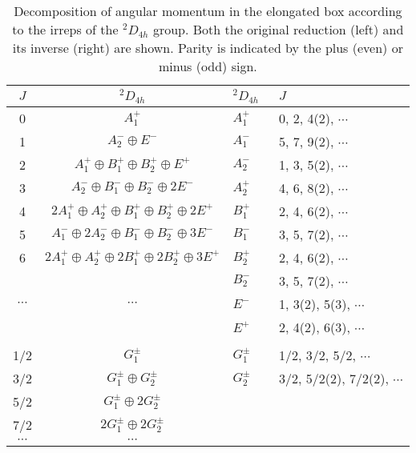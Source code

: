 \documentclass[aps,prd,reprint,showpacs,floatfix,longbibliography,,superscriptaddress]{revtex4-1}
\begin{document}
\begin{widetext}
%
\begin{table}
\begin{tabular}{c c | l l }\toprule
$J$ & $^2D_{4h}$  &  $^2D_{4h}\;\;$ &  $J$\\
\hline
0 & $A^+_1$                                                                                           & $A^+_1\;\;$  & 0,  2, 4(2),    $\cdots$   \\
1 & $A^-_2 \oplus E^-$                                                                           &  $A^-_1\;\;$  &  5,  7,  9(2), $\cdots$ \\
2 & $A^+_1 \oplus B^+_1\oplus B^+_2 \oplus E^+$                               & $A^-_2\;\;$  & 1,  3, 5(2),  $\cdots$   \\
3 & $A^-_2 \oplus B^-_1\oplus B^-_2 \oplus 2E^-$                                 & $A^+_2\;\;$  &  4, 6, 8(2),  $\cdots$   \\
4 & $2A^+_1 \oplus A^+_2\oplus B^+_1 \oplus B^+_2 \oplus 2E^+$      &   $B^+_1\;\;$  & 2,  4, 6(2), $\cdots$     \\
5 & $ A^-_1 \oplus 2A^-_2\oplus B^-_1 \oplus B^-_2 \oplus 3E^-$         &   $B^-_1\;\;$  & 3,  5, 7(2), $\cdots$  \\
6 & $2A^+_1 \oplus  A^+_2 \oplus 2B^+_1\oplus 2B^+_2 \oplus 3E^+$ &   $B^+_2\;\;$  & 2, 4, 6(2), $\cdots$ \\
   &                                                                                                            & $B^-_2\;\;$  & 3, 5, 7(2), $\cdots$  \\
$\cdots$ & $\cdots$                                                                                 & $E^-\;\;$   & 1,  3(2), 5(3), $\cdots$   \\
   &                                                                                                           &  $E^+\;\;$    &  2,  4(2), 6(3), $\cdots$ \\
   &                                                                                                            &   & \\
1/2 & $G^\pm_1$                                                                                      & $G^\pm_1\;\;$  & 1/2,  3/2, 5/2,  $\cdots$   \\
3/2 & $G^\pm_1\oplus G^\pm_2 $                                                            & $G^\pm_2\;\;$  & 3/2, 5/2(2), 7/2(2),  $\cdots$  \\
5/2 & $ G^\pm_1\oplus 2G^\pm_2 $    & &  \\
7/2 & $2G^\pm_1\oplus 2G^\pm_2 $   & & \\
$\cdots$ & $\cdots$  \\
\bottomrule
\end{tabular}
\caption{Decomposition of angular momentum in the elongated box according to the irreps of the $^2D_{4h}$ group. 
Both the original reduction (left) and its inverse (right) are shown. Parity is indicated by the plus (even) or minus (odd) sign.}
\label{tab:2D4h}
\end{table}
%


\end{widetext}
\end{document}
